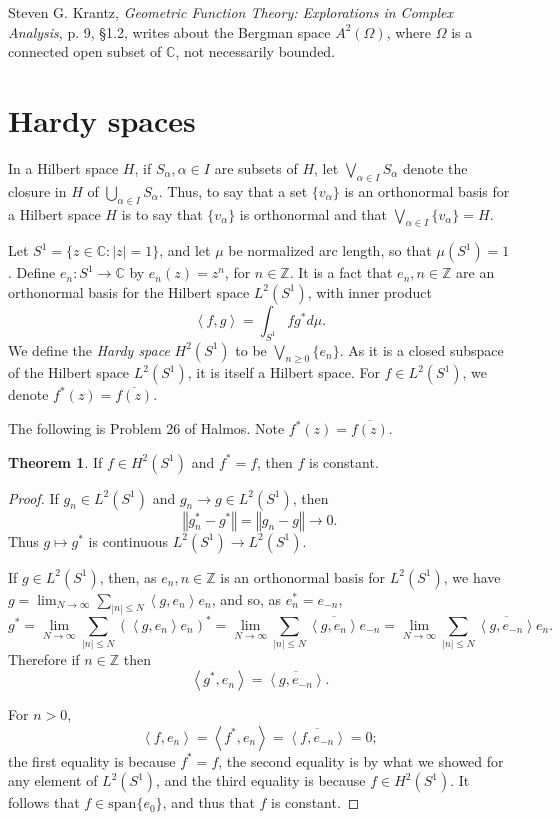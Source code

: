 \documentclass{article}
\newcommand{\inner}[2]{\left\langle #1, #2 \right\rangle}
\newcommand{\Span}{\textrm{span}}
\newcommand{\norm}[1]{\left\Vert #1 \right\Vert}
\theoremstyle{definition}
\newtheorem{theorem}{Theorem}
\begin{document}
Steven G. Krantz, {\em Geometric Function Theory: Explorations in Complex Analysis},
p. 9, \S 1.2, writes about the Bergman space $A^2(\Omega)$, where $\Omega$ is a connected
open subset of $\mathbb{C}$, not necessarily bounded.





\section{Hardy spaces}
In a Hilbert  space $H$, if $S_\alpha, \alpha \in I$ are subsets of $H$, let $\bigvee_{\alpha \in I} S_\alpha$ denote the closure in $H$ of
$\bigcup_{\alpha \in I} S_\alpha$. Thus, to say that a set $\{v_\alpha\}$ is an orthonormal basis for a Hilbert space $H$ is to say that $\{v_\alpha\}$ is orthonormal
and that $\bigvee_{\alpha \in I} \{v_\alpha\}=H$.

Let $S^1=\{z \in \mathbb{C}: |z|=1\}$, and let $\mu$ be normalized arc length, so that $\mu(S^1)=1$. Define $e_n:S^1 \to \mathbb{C}$ by $e_n(z)=z^n$, for
$n \in \mathbb{Z}$. 
It is a fact that $e_n, n \in \mathbb{Z}$ are an orthonormal basis for the Hilbert space
$L^2(S^1)$, with inner product
\[
\inner{f}{g}=\int_{S^1} f g^* d\mu.
\]
We define the {\em Hardy space} $H^2(S^1)$ to be $\bigvee_{n \geq 0} \{e_n\}$.
As it is a closed subspace of the Hilbert space $L^2(S^1)$, it is itself a Hilbert space. 
For $f \in L^2(S^1)$, we denote $f^*(z)=\overline{f(z)}$.

The following is Problem 26 of Halmos. Note $f^*(z)=\overline{f(z)}$.

\begin{theorem}
If $f \in H^2(S^1)$ and $f^*=f$, then $f$ is constant.
\end{theorem}
\begin{proof}
If $g_n \in L^2(S^1)$ and $g_n \to g \in L^2(S^1)$, then
\[
\norm{g_n^*-g^*}=\norm{g_n-g} \to 0.
\]
Thus $g \mapsto g^*$ is continuous $L^2(S^1) \to L^2(S^1)$.

If $g \in L^2(S^1)$, then, as $e_n, n \in \mathbb{Z}$ is an orthonormal basis for $L^2(S^1)$, we have
 $g=\lim_{N \to \infty} \sum_{|n| \leq N} \inner{g}{e_n} e_n$, and so, as $e_n^*=e_{-n}$,
\[
g^* = \lim_{N \to \infty} \sum_{|n| \leq N} (\inner{g}{e_n} e_n)^* = \lim_{N \to \infty} \sum_{|n| \leq N} \overline{\inner{g}{e_n}} e_{-n} 
= \lim_{N \to \infty} \sum_{|n| \leq N} \overline{\inner{g}{e_{-n}}} e_n.
\]
Therefore if $n \in \mathbb{Z}$ then
\begin{equation}
\inner{g^*}{e_n}=\overline{\inner{g}{e_{-n}}}.
\label{gstar}
\end{equation}

For
$n>0$,
\[
\inner{f}{e_n}=\inner{f^*}{e_n}=\overline{\inner{f}{e_{-n}}}=0;
\]
the first equality is because $f^*=f$, the second equality is by what we showed for any element of $L^2(S^1)$, and the third equality
is because $f \in H^2(S^1)$. It follows that $f \in \Span\{e_0\}$, and thus that $f$ is constant.
\end{proof}
\end{document}
